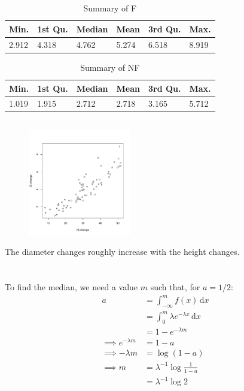 \documentclass[twocolumn]{article}
\newcommand{\setsection}[1]{\setcounter{section}{#1}\addtocounter{section}{-1}\section{}}
\newcommand{\intg}[4]{\int_{#1}^{#2} \! #3 \, \mathrm{d}#4}
\begin{document}
\subsection{}
\begin{table}[h]
\begin{tabular}{@{}llllll@{}}
\toprule
Min.  & 1st Qu. & Median & Mean  & 3rd Qu. & Max.  \\ \midrule
2.912 & 4.318   & 4.762  & 5.274 & 6.518   & 8.919 \\ \bottomrule
\end{tabular}
\caption{Summary of F}
\end{table}
\begin{table}[h]
\begin{tabular}{llllll}
\toprule
Min.  & 1st Qu. & Median & Mean  & 3rd Qu. & Max.  \\ \midrule
1.019 & 1.915   & 2.712  & 2.718 & 3.165   & 5.712 \\ \bottomrule
\end{tabular}
\caption{Summary of NF}
\end{table}

\newpage

\subsection{}
\begin{figure}[h]
\centering
\includegraphics[width=0.4\textwidth]{6e.pdf}
\end{figure}
The diameter changes roughly increase with the height changes.

\setsection{8}
\subsection{}
To find the median, we need a value $m$ such that, for $a=1/2$:
\begin{align*}
a	& = \intg{-\infty}{m}{f(x)}{x}	\\
	& = \intg{0}{m}{\lambda  e^{-\lambda  x}}{x} \\
	& = 1-e^{-\lambda m}\\
\implies e^{-\lambda m} &= 1-a \\
\implies -\lambda m		&= \log (1-a) \\
\implies m				&= \lambda^{-1}\log\frac{1}{1-a} \\
&= \lambda^{-1}\log 2
\end{align*}
\end{document}
